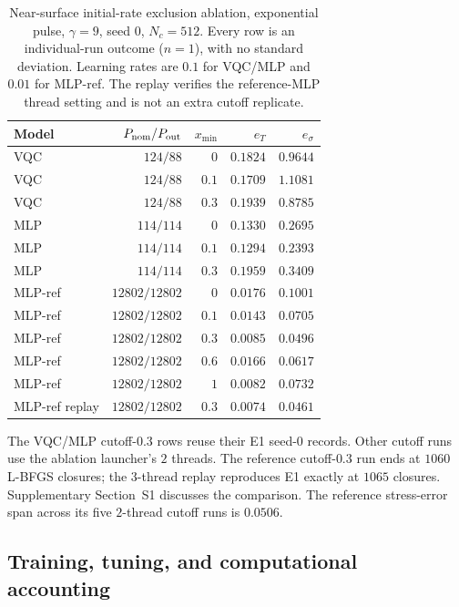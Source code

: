 \documentclass[11pt]{article}
\begin{document}
\begin{table}[htbp]
\centering\footnotesize
\caption{Near-surface initial-rate exclusion ablation, exponential pulse,
$\gamma=9$, seed $0$, $N_c=512$. Every row is an individual-run outcome
($n=1$), with no standard deviation. Learning rates are $0.1$ for VQC/MLP
and $0.01$ for MLP-ref. The replay verifies the reference-MLP thread
setting and is not an extra cutoff replicate.}
\label{tab:xmin}
\setlength{\tabcolsep}{3pt}
\begin{tabular}{lrrrr}
\toprule
Model & $P_{\rm nom}/P_{\rm out}$ & $x_{\min}$ & $e_T$ & $e_\sigma$ \\
\midrule
VQC & $124/88$ & $0$ & $0.1824$ & $0.9644$ \\
VQC & $124/88$ & $0.1$ & $0.1709$ & $1.1081$ \\
VQC & $124/88$ & $0.3$ & $0.1939$ & $0.8785$ \\
\midrule
MLP & $114/114$ & $0$ & $0.1330$ & $0.2695$ \\
MLP & $114/114$ & $0.1$ & $0.1294$ & $0.2393$ \\
MLP & $114/114$ & $0.3$ & $0.1959$ & $0.3409$ \\
\midrule
MLP-ref & $12802/12802$ & $0$ & $0.0176$ & $0.1001$ \\
MLP-ref & $12802/12802$ & $0.1$ & $0.0143$ & $0.0705$ \\
MLP-ref & $12802/12802$ & $0.3$ & $0.0085$ & $0.0496$ \\
MLP-ref & $12802/12802$ & $0.6$ & $0.0166$ & $0.0617$ \\
MLP-ref & $12802/12802$ & $1$ & $0.0082$ & $0.0732$ \\
MLP-ref replay & $12802/12802$ & $0.3$ & $0.0074$ & $0.0461$ \\
\bottomrule
\end{tabular}
\par\smallskip
\begin{minipage}{\textwidth}\footnotesize
The VQC/MLP cutoff-$0.3$ rows reuse their E1 seed-$0$ records. Other
cutoff runs use the ablation launcher's $2$ threads. The reference
cutoff-$0.3$ run ends at $1060$ L-BFGS closures; the $3$-thread replay
reproduces E1 exactly at $1065$ closures. Supplementary Section~S1 discusses the comparison. The reference stress-error span across its
five $2$-thread cutoff runs is $0.0506$.
\end{minipage}
\end{table}

\subsection{Training, tuning, and computational accounting}
\end{document}
